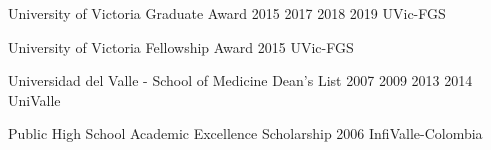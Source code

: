 \begin{cvhonors}
  \cvhonor
    {University of Victoria Graduate Award} %
    {2015 2017 2018 2019} %
    {UVic-FGS} %
    {} %

  \cvhonor
    {University of Victoria Fellowship Award} %
    {2015} %
    {UVic-FGS} %
    {} %

  \cvhonor
    {Universidad del Valle - School of Medicine Dean's List} %
    {2007 2009 2013 2014} %
    {UniValle} %
    {} %

  \cvhonor
    {Public High School Academic Excellence Scholarship} %
    {2006} %
    {InfiValle-Colombia} %
    {} %


\end{cvhonors}







